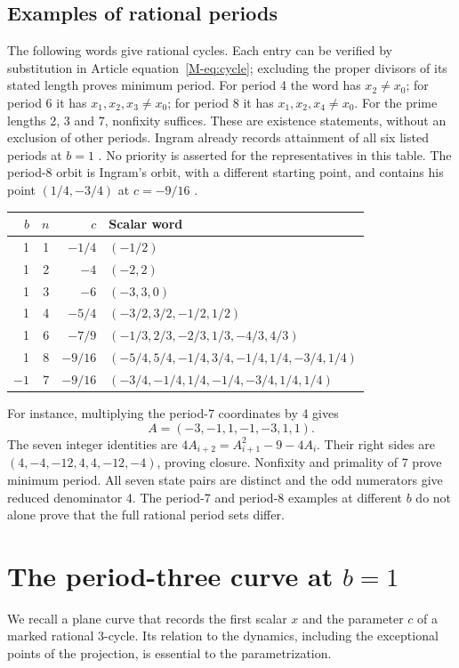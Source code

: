 \documentclass{jT}
\begin{document}
\subsection{Examples of rational periods}\label{sec:examples}
The following words give rational cycles. Each entry can be verified by substitution in Article equation~\eqref{M-eq:cycle}; excluding the proper divisors of its stated length proves minimum period. For period 4 the word has $x_2\ne x_0$; for period 6 it has $x_1,x_2,x_3\ne x_0$; for period 8 it has $x_1,x_2,x_4\ne x_0$. For the prime lengths 2, 3 and 7, nonfixity suffices. These are existence statements, without an exclusion of other periods. Ingram already records attainment of all six listed periods at $b=1$ \cite[p.~4]{ingram}. No priority is asserted for the representatives in this table. The period-8 orbit is Ingram's orbit, with a different starting point, and contains his point $(1/4,-3/4)$ at $c=-9/16$ \cite[p.~4]{ingram}.
\begin{center}\small
\begin{tabular}{rrrl}
\toprule $b$ & $n$ & $c$ & Scalar word\\\midrule
1&1&$-1/4$&$(-1/2)$\\
1&2&$-4$&$(-2,2)$\\
1&3&$-6$&$(-3,3,0)$\\
1&4&$-5/4$&$(-3/2,3/2,-1/2,1/2)$\\
1&6&$-7/9$&$(-1/3,2/3,-2/3,1/3,-4/3,4/3)$\\
1&8&$-9/16$&$(-5/4,5/4,-1/4,3/4,-1/4,1/4,-3/4,1/4)$\\
$-1$&7&$-9/16$&$(-3/4,-1/4,1/4,-1/4,-3/4,1/4,1/4)$\\
\bottomrule
\end{tabular}\end{center}
For instance, multiplying the period-7 coordinates by 4 gives
\[A=(-3,-1,1,-1,-3,1,1).\] The seven integer identities are $4A_{i+2}=A_{i+1}^2-9-4A_i$. Their right sides are $(4,-4,-12,4,4,-12,-4)$, proving closure. Nonfixity and primality of 7 prove minimum period. All seven state pairs are distinct and the odd numerators give reduced denominator 4. The period-7 and period-8 examples at different $b$ do not alone prove that the full rational period sets differ.

\section{The period-three curve at \texorpdfstring{$b=1$}{b=1}}\label{sec:genus}
We recall a plane curve that records the first scalar $x$ and the parameter $c$ of a marked rational 3-cycle. Its relation to the dynamics, including the exceptional points of the projection, is essential to the parametrization.
\end{document}
